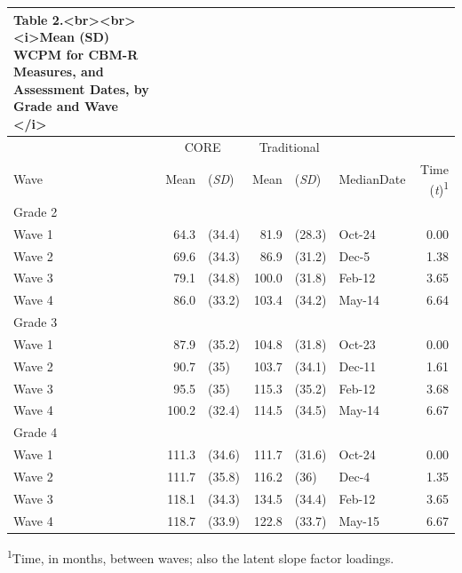 \documentclass[
  english,
  man, fleqn, noextraspace]{apa6}
\begin{document}
\captionsetup[table]{labelformat=empty,skip=1pt}
\begin{longtable}{lrlrllr}
\caption*{
\large Table 2.<br><br><i>Mean (SD) WCPM for CBM-R Measures, and Assessment Dates, by Grade and Wave </i>\\ 
} \\ 
\toprule
& \multicolumn{2}{c}{CORE} & \multicolumn{2}{c}{Traditional} & & \\ 
 \cmidrule(lr){2-3}\cmidrule(lr){4-5}
Wave & Mean & (\emph{SD}) & Mean & (\emph{SD}) & MedianDate & Time (\emph{t})\textsuperscript{1} \\ 
\midrule
\multicolumn{1}{l}{Grade 2} \\ 
\midrule
Wave 1 & 64.3 & (34.4) & 81.9 & (28.3) & Oct-24 & 0.00 \\ 
Wave 2 & 69.6 & (34.3) & 86.9 & (31.2) & Dec-5 & 1.38 \\ 
Wave 3 & 79.1 & (34.8) & 100.0 & (31.8) & Feb-12 & 3.65 \\ 
Wave 4 & 86.0 & (33.2) & 103.4 & (34.2) & May-14 & 6.64 \\ 
\midrule
\multicolumn{1}{l}{Grade 3} \\ 
\midrule
Wave 1 & 87.9 & (35.2) & 104.8 & (31.8) & Oct-23 & 0.00 \\ 
Wave 2 & 90.7 & (35) & 103.7 & (34.1) & Dec-11 & 1.61 \\ 
Wave 3 & 95.5 & (35) & 115.3 & (35.2) & Feb-12 & 3.68 \\ 
Wave 4 & 100.2 & (32.4) & 114.5 & (34.5) & May-14 & 6.67 \\ 
\midrule
\multicolumn{1}{l}{Grade 4} \\ 
\midrule
Wave 1 & 111.3 & (34.6) & 111.7 & (31.6) & Oct-24 & 0.00 \\ 
Wave 2 & 111.7 & (35.8) & 116.2 & (36) & Dec-4 & 1.35 \\ 
Wave 3 & 118.1 & (34.3) & 134.5 & (34.4) & Feb-12 & 3.65 \\ 
Wave 4 & 118.7 & (33.9) & 122.8 & (33.7) & May-15 & 6.67 \\ 
\bottomrule
\end{longtable}
\vspace{-5mm}
\begin{minipage}{\linewidth}
\textsuperscript{1}Time, in months, between waves; also the latent slope factor loadings. \\ 
\end{minipage}
\end{document}
